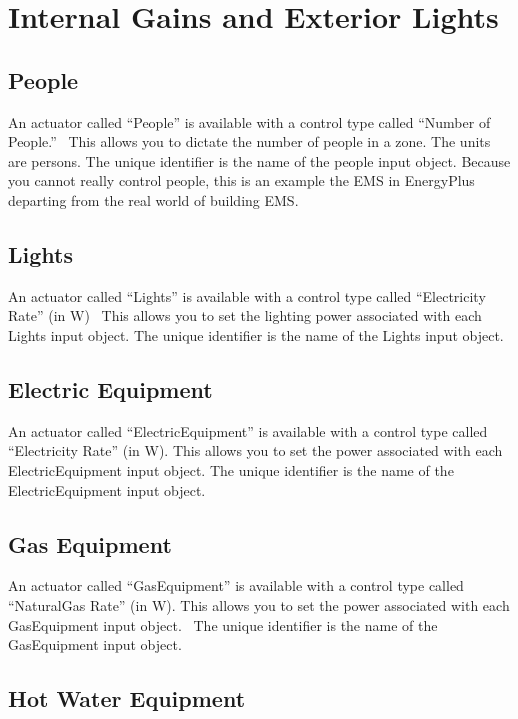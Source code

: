 \section{Internal Gains and Exterior Lights}\label{internal-gains-and-exterior-lights}

\subsection{People}\label{people}

An actuator called ``People'' is available with a control type called ``Number of People.''~ This allows you to dictate the number of people in a zone. The units are persons. The unique identifier is the name of the people input object. Because you cannot really control people, this is an example the EMS in EnergyPlus departing from the real world of building EMS.

\subsection{Lights}\label{lights}

An actuator called ``Lights'' is available with a control type called ``Electricity Rate'' (in W)~ This allows you to set the lighting power associated with each Lights input object. The unique identifier is the name of the Lights input object.

\subsection{Electric Equipment}\label{electric-equipment}

An actuator called ``ElectricEquipment'' is available with a control type called ``Electricity Rate'' (in W). This allows you to set the power associated with each ElectricEquipment input object. The unique identifier is the name of the ElectricEquipment input object.

\subsection{Gas Equipment}\label{gas-equipment}

An actuator called ``GasEquipment'' is available with a control type called ``NaturalGas Rate'' (in W). This allows you to set the power associated with each GasEquipment input object.~ The unique identifier is the name of the GasEquipment input object.

\subsection{Hot Water Equipment}\label{hot-water-equipment}

